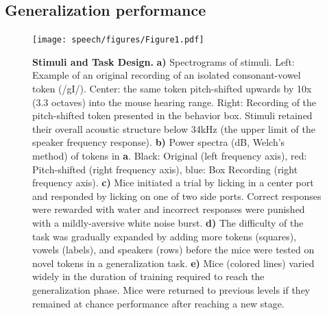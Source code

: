 \subsection{Generalization performance}

\begin{figure}
\texttt{[image: speech/figures/Figure1.pdf]}
\caption{\textbf{Stimuli and Task Design.} \textbf{a)} Spectrograms of stimuli. Left: Example of an original recording of an isolated consonant-vowel token (/gI/). Center: the same token pitch-shifted upwards by 10x (3.3 octaves) into the mouse hearing range. Right: Recording of the pitch-shifted token presented in the behavior box. Stimuli retained their overall acoustic structure below 34kHz (the upper limit of the speaker frequency response). \textbf{b)} Power spectra (dB, Welch's method) of tokens in \textbf{a}. Black: Original (left frequency axis), red: Pitch-shifted (right frequency axis), blue: Box Recording (right frequency axis). \textbf{c)} Mice initiated a trial by licking in a center port and responded by licking on one of two side ports. Correct responses were rewarded with water and incorrect responses were punished with a mildly-aversive white noise burst. \textbf{d)} The difficulty of the task was gradually expanded by adding more tokens (squares), vowels (labels), and speakers (rows) before the mice were tested on novel tokens in a generalization task. \textbf{e)} Mice (colored lines) varied widely in the duration of training required to reach the generalization phase. Mice were returned to previous levels if they remained at chance performance after reaching a new stage.
}
\label{spectro}
\end{figure}
%
%
%

